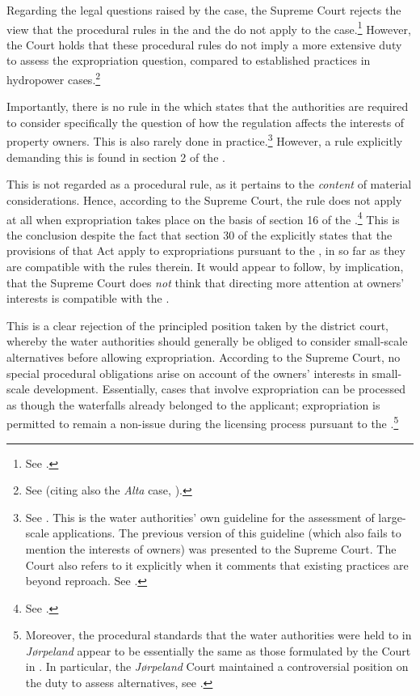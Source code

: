 Regarding the legal questions raised by the case, the Supreme Court rejects the view that the procedural rules in the \cite{ea59} and the \cite{paa67} do not apply to the case.\footnote{See \cite[32-34]{jorpeland11}.} However, the Court holds that these procedural rules do not imply a more extensive duty to assess the expropriation question, compared to established practices in hydropower cases.\footnote{See \cite[51-52]{jorpeland11} (citing also the {\it Alta} case, \cite{alta82}).}

Importantly, there is no rule in the \cite{wra17} which states that the authorities are required to consider specifically the question of how the regulation affects the interests of property owners. This is also rarely done in practice.\footnote{See \cite{stokker10}. This is the water authorities' own guideline for the assessment of large-scale applications. The previous version of this guideline (which also fails to mention the interests of owners) was presented to the Supreme Court. The Court also refers to it explicitly when it comments that existing practices are beyond reproach. See \cite[51]{jorpeland11}.} However, a rule explicitly demanding this is found in section 2 of the \cite{ea59}. 

This is not regarded as a procedural rule, as it pertains to the {\it content} of material considerations. Hence, according to the Supreme Court, the rule does not apply at all when expropriation takes place on the basis of section 16 of the \cite{wra17}.\footnote{See \cite[30]{jorpeland11}.} This is the conclusion despite the fact that section 30 of the \cite{ea59} explicitly states that the provisions of that Act apply to expropriations pursuant to the \cite{wra17}, in so far as they are compatible with the rules therein. It would appear to follow, by implication, that the Supreme Court does {\it not} think that directing more attention at owners' interests is compatible with the \cite{wra17}.

This is a clear rejection of the principled position taken by the district court, whereby the water authorities should generally be obliged to consider small-scale alternatives before allowing expropriation. According to the Supreme Court, no special procedural obligations arise on account of the owners' interests in small-scale development. Essentially, cases that involve expropriation can be processed as though the waterfalls already belonged to the applicant; expropriation is permitted to remain a non-issue during the licensing process pursuant to the \cite{wra17}.\footnote{Moreover, the procedural standards that the water authorities were held to in {\it Jørpeland} appear to be essentially the same as those formulated by the Court in \cite{alta82}. In particular, the {\it Jørpeland} Court maintained a controversial position on the duty to assess alternatives, see \cite[157]{winge13}.}

